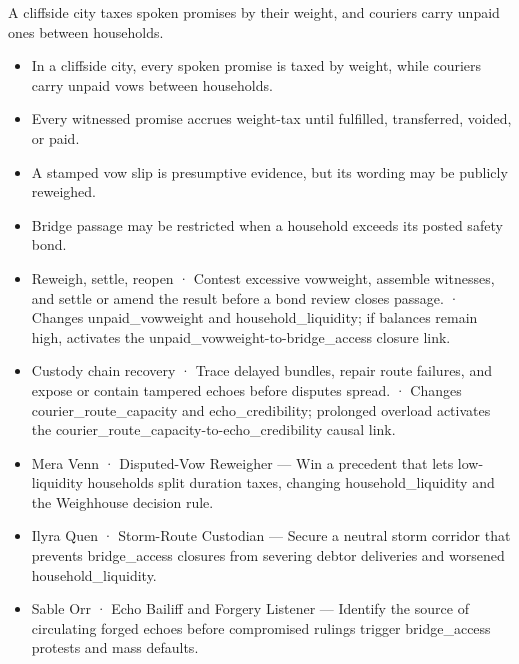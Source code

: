 \documentclass[10pt,a4paper]{article}
\newcommand{\heading}[1]{\par\vspace{5pt}{\color{teal}\bfseries #1}\par}
\begin{document}
\heading{共同生成要求}
{\small A cliffside city taxes spoken promises by their weight, and couriers carry unpaid ones between households.}\par\vspace{6pt}
\begin{minipage}[t]{0.48\linewidth}\fontsize{9}{12}\selectfont\raggedright\setlength{\parskip}{0pt}
\heading{世界概述}\begin{itemize}
\item In a cliffside city, every spoken promise is taxed by weight, while couriers carry unpaid vows between households.
\end{itemize}
\heading{规则与制度}\begin{itemize}
\item Every witnessed promise accrues weight-tax until fulfilled, transferred, voided, or paid.
\item A stamped vow slip is presumptive evidence, but its wording may be publicly reweighed.
\item Bridge passage may be restricted when a household exceeds its posted safety bond.
\end{itemize}
\heading{活动与压力}\begin{itemize}
\item Reweigh, settle, reopen · Contest excessive vowweight, assemble witnesses, and settle or amend the result before a bond review closes passage. · Changes unpaid\_vowweight and household\_liquidity; if balances remain high, activates the unpaid\_vowweight-to-bridge\_access closure link.
\item Custody chain recovery · Trace delayed bundles, repair route failures, and expose or contain tampered echoes before disputes spread. · Changes courier\_route\_capacity and echo\_credibility; prolonged overload activates the courier\_route\_capacity-to-echo\_credibility causal link.
\end{itemize}
\heading{人物与目标}\begin{itemize}
\item Mera Venn · Disputed-Vow Reweigher — Win a precedent that lets low-liquidity households split duration taxes, changing household\_liquidity and the Weighhouse decision rule.
\item Ilyra Quen · Storm-Route Custodian — Secure a neutral storm corridor that prevents bridge\_access closures from severing debtor deliveries and worsened household\_liquidity.
\item Sable Orr · Echo Bailiff and Forgery Listener — Identify the source of circulating forged echoes before compromised rulings trigger bridge\_access protests and mass defaults.
\end{itemize}
\end{minipage}\hfill
\end{document}
